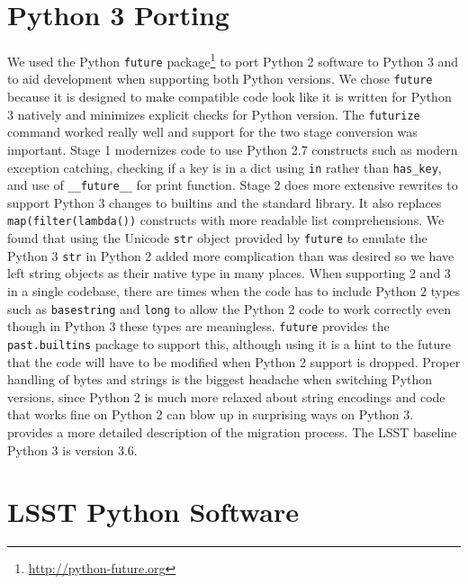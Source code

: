\documentclass[11pt,twoside]{article}
\begin{document}
\section{Python 3 Porting}

We used the Python \verb|future| package\footnote{\url{http://python-future.org}} to port Python 2 software to Python 3 and to aid development when supporting both Python versions.
We chose \verb|future| because it is designed to make compatible code look like it is written for Python 3 natively and minimizes explicit checks for Python version.
The \verb|futurize| command worked really well and support for the two stage conversion was important.
Stage 1 modernizes code to use Python 2.7 constructs such as modern exception catching, checking if a key is in a dict using \verb|in| rather than \verb|has_key|, and use of \verb|__future__| for print function.
Stage 2 does more extensive rewrites to support Python 3 changes to builtins and the standard library.
It also replaces \verb|map(filter(lambda())| constructs with more readable list comprehensions.
We found that using the Unicode \verb|str| object provided by \verb|future| to emulate the Python 3 \verb|str| in Python 2 added more complication than was desired so we have left string objects as their native type in many places.
When supporting 2 and 3 in a single codebase, there are times when the code has to include Python 2 types such as \texttt{basestring} and \texttt{long} to allow the Python 2 code to work correctly even though in Python 3 these types are meaningless.
\verb|future| provides the \texttt{past.builtins} package to support this, although using it is a hint to the future that the code will have to be modified when Python 2 support is dropped.
Proper handling of bytes and strings is the biggest headache when switching Python versions, since Python 2 is much more relaxed about string encodings and code that works fine on Python 2 can blow up in surprising ways on Python 3.
\citet{SQR-014} provides a more detailed description of the migration process.
The LSST baseline Python 3 is version 3.6.

\section{LSST Python Software}
\end{document}
